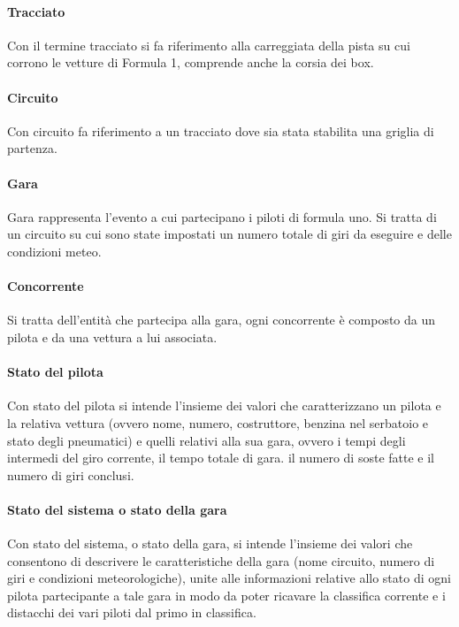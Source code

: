 \documentclass[a4paper,11pt, twoside, openright]{book}
\begin{document}
      \paragraph{Tracciato}
        Con il termine tracciato si fa riferimento alla carreggiata della pista su cui corrono le vetture di Formula 1, 
	comprende anche la corsia dei box.
      
      \paragraph{Circuito}
        Con circuito fa riferimento a un tracciato dove sia stata stabilita una griglia di partenza.
	
      \paragraph{Gara}
        Gara rappresenta l'evento a cui partecipano i piloti di formula uno. Si tratta di un circuito
	su cui sono state impostati un numero totale di giri da eseguire e delle condizioni meteo.
	
      \paragraph{Concorrente}
        Si tratta dell'entità che partecipa alla gara, ogni concorrente è composto da un pilota e da una vettura
	a lui associata.  
        
      \paragraph{Stato del pilota}
        Con stato del pilota si intende l'insieme dei valori che caratterizzano un pilota e la relativa vettura 
	(ovvero nome, numero, costruttore, benzina nel serbatoio e stato degli pneumatici) e quelli relativi
	alla sua gara, ovvero i tempi degli intermedi del giro corrente, il tempo totale di gara. il numero
	di soste fatte e il numero di giri conclusi.
	
      \paragraph{Stato del sistema o stato della gara}
        Con stato del sistema, o stato della gara, si intende l'insieme dei valori che consentono di descrivere 
	le caratteristiche della gara (nome circuito, numero di giri e condizioni meteorologiche), unite alle informazioni
	relative allo stato di ogni pilota partecipante a tale gara in modo da poter ricavare la classifica corrente
	e i distacchi dei vari piloti dal primo in classifica.
\end{document}
